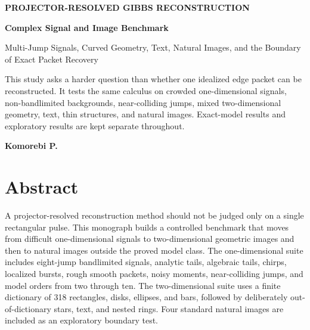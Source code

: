 \documentclass[11pt,oneside,openany]{book}
\theoremstyle{definition}
\theoremstyle{remark}
\begin{document}
\hypersetup{pageanchor=false}

\begin{titlepage}
\centering
\vspace*{0.55in}
{\Large\color{Blue}\bfseries PROJECTOR-RESOLVED GIBBS RECONSTRUCTION\par}
\vspace{0.18in}
{\Huge\bfseries Complex Signal and Image Benchmark\par}
\vspace{0.16in}
{\Large Multi-Jump Signals, Curved Geometry, Text, Natural Images, and the Boundary of Exact Packet Recovery\par}
\vspace{0.40in}
\begin{minipage}{0.82\linewidth}
\large
This study asks a harder question than whether one idealized edge packet can be reconstructed. It tests the same calculus on crowded one-dimensional signals, non-bandlimited backgrounds, near-colliding jumps, mixed two-dimensional geometry, text, thin structures, and natural images. Exact-model results and exploratory results are kept separate throughout.
\end{minipage}
\vfill
{\Large\bfseries Komorebi P.\par}
\vspace{0.55in}
\end{titlepage}

\frontmatter
\hypersetup{pageanchor=true}
\chapter*{Abstract}
A projector-resolved reconstruction method should not be judged only on a single rectangular pulse. This monograph builds a controlled benchmark that moves from difficult one-dimensional signals to two-dimensional geometric images and then to natural images outside the proved model class. The one-dimensional suite includes eight-jump bandlimited signals, analytic tails, algebraic tails, chirps, localized bursts, rough smooth packets, noisy moments, near-colliding jumps, and model orders from two through ten. The two-dimensional suite uses a finite dictionary of 318 rectangles, disks, ellipses, and bars, followed by deliberately out-of-dictionary stars, text, and nested rings. Four standard natural images are included as an exploratory boundary test.
\end{document}
